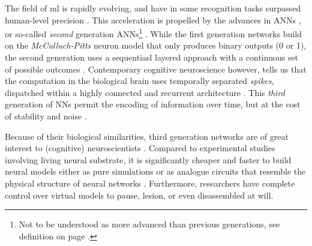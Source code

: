 \documentclass[report.tex]{subfiles}
\begin{document}
\begin{comment}
\gls{ANN}s have been studied extensively and have surpassed human performance
in a number of tasks (most recently the 
advanced real-time strategy game Starcraft II \cite{DeepMind2019})
\autocite{Schmidhuber2014, Nilsson2009, Russel2007}.
\gls{SNN}s have been studied extensively in smaller applications such as single-neuron studies 
\autocite{Dayan2001, Indiveri2015}, but studies in larger scale are still rare,
although \textcite{Hunsberger2015, Jordan2018, Lin2018, Pfeil2013,
Rueckauer2017, Schmitt2017} have constructed classifiers that reach
near-\gls{ANN} precision, but with a 


\gls{SNN}s have been studied extensively in smaller applications such as single-neuron studies, but less so in larger setups such as learning and classification tasks \autocite{dayan2001, Indiveri2015}.
Conversely \gls{ANN}s have been extensively studied in more complex tasks where architectures such as \gls{DNN} have excelled \autocite{schmidhuber2014, Nilsson2009, russel2007}.
\end{comment}

The field of \gls{ml} is rapidly evolving, and have in
some recognition tasks surpassed human-level precision
\autocite{Schmidhuber2014}.
This acceleration is propelled by the advances in \gls{ANN}s
\autocite{Rumelhart1988, Schmidhuber2014, Nilsson2009}, or
so-called \textit{second} generation \gls{ANN}s\footnote{Not to be 
understood as more advanced than previous generations, see definition on page
\pageref{sec:glossary}.} \cite{Maass1997}.
While the first generation networks build on the \textit{McCulluch-Pitts}
neuron model that only produces binary outputs (0 or 1), the second
generation uses a sequentiasl layered approach with a continuous set of 
possible outcomes \cite{Maass1997, Russel2007}.
Contemporary cognitive neuroscience however, tells us that the computation
in the biological brain uses temporally separated \textit{spikes}, 
dispatched within a highly connected and recurrent architecture 
\cite{Dayan2001, Eliasmith2004}.
This \textit{third} generation of \gls{NN}s permit the encoding
of information over time, but at the cost of stability and 
noise \autocite{Maass1997}.

Because of their biological similarities, third generation 
networks are of great interest to (cognitive) neuroscientists
\autocite{Dayan2001,Bruderle2011,Eliasmith2015}.
Compared to experimental studies involving living neural substrate,
it is significantly cheaper and faster to build neural 
models either as pure simulations
\autocite{Davison2009, Eliasmith2015} or as analogue circuits
that resemble the physical structure of neural networks
\autocite{Walter2015, Schmitt2017}.
Furthermore, researchers have complete control over virtual models
to pause, lesion, or even disassembled at will.
\end{document}

